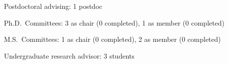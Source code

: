 \begin{tightItemize}
    \item Postdoctoral advising: 1 postdoc
    \item Ph.D.\ Committees: 3 as chair (0 completed), 1 as member (0 completed)
    \item M.S.\ Committees:  1 as chair (0 completed), 2 as member (0 completed)
    \item Undergraduate research advisor: 3 students
\end{tightItemize}
